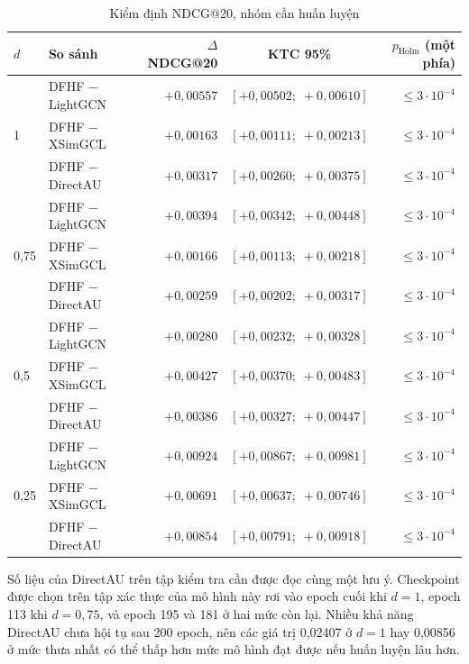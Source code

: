 \begin{table}[H]
\centering
\small
\begin{tabular}{@{}llrcr@{}}
\toprule
$d$ & So sánh & $\Delta$ NDCG@20 & KTC 95\% & $p_{\mathrm{Holm}}$ (một phía) \\
\midrule
\multirow{3}{*}{1} & DFHF $-$ LightGCN & $+0{,}00557$ & $[+0{,}00502;\;+0{,}00610]$ & $\le 3\cdot10^{-4}$ \\
 & DFHF $-$ XSimGCL & $+0{,}00163$ & $[+0{,}00111;\;+0{,}00213]$ & $\le 3\cdot10^{-4}$ \\
 & DFHF $-$ DirectAU & $+0{,}00317$ & $[+0{,}00260;\;+0{,}00375]$ & $\le 3\cdot10^{-4}$ \\
\midrule
\multirow{3}{*}{0,75} & DFHF $-$ LightGCN & $+0{,}00394$ & $[+0{,}00342;\;+0{,}00448]$ & $\le 3\cdot10^{-4}$ \\
 & DFHF $-$ XSimGCL & $+0{,}00166$ & $[+0{,}00113;\;+0{,}00218]$ & $\le 3\cdot10^{-4}$ \\
 & DFHF $-$ DirectAU & $+0{,}00259$ & $[+0{,}00202;\;+0{,}00317]$ & $\le 3\cdot10^{-4}$ \\
\midrule
\multirow{3}{*}{0,5} & DFHF $-$ LightGCN & $+0{,}00280$ & $[+0{,}00232;\;+0{,}00328]$ & $\le 3\cdot10^{-4}$ \\
 & DFHF $-$ XSimGCL & $+0{,}00427$ & $[+0{,}00370;\;+0{,}00483]$ & $\le 3\cdot10^{-4}$ \\
 & DFHF $-$ DirectAU & $+0{,}00386$ & $[+0{,}00327;\;+0{,}00447]$ & $\le 3\cdot10^{-4}$ \\
\midrule
\multirow{3}{*}{0,25} & DFHF $-$ LightGCN & $+0{,}00924$ & $[+0{,}00867;\;+0{,}00981]$ & $\le 3\cdot10^{-4}$ \\
 & DFHF $-$ XSimGCL & $+0{,}00691$ & $[+0{,}00637;\;+0{,}00746]$ & $\le 3\cdot10^{-4}$ \\
 & DFHF $-$ DirectAU & $+0{,}00854$ & $[+0{,}00791;\;+0{,}00918]$ & $\le 3\cdot10^{-4}$ \\
\bottomrule
\end{tabular}
\caption{Kiểm định NDCG@20, nhóm cần huấn luyện}
\label{tab:trained-sig}
\end{table}

Số liệu của DirectAU trên tập kiểm tra cần được đọc cùng một lưu ý. Checkpoint được chọn trên tập xác thực của mô hình này rơi vào epoch cuối khi $d=1$, epoch 113 khi $d=0{,}75$, và epoch 195 và 181 ở hai mức còn lại. Nhiều khả năng DirectAU chưa hội tụ sau 200 epoch, nên các giá trị 0,02407 ở $d=1$ hay 0,00856 ở mức thưa nhất có thể thấp hơn mức mô hình đạt được nếu huấn luyện lâu hơn.

